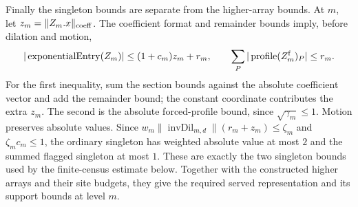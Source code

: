 Finally the singleton bounds are separate from the higher-array
bounds. At $m$, let $z_m=\|Z_m.x\|_{\rm coeff}$. The coefficient
format and remainder bounds imply, before dilation and motion,
\[
 |\operatorname{exponentialEntry}(Z_m)|\le(1+c_m)z_m+r_m,
 \qquad \sum_P|\operatorname{profile}(Z_m^{\rm f})_P|\le r_m.
\]
For the first inequality, sum the section bounds against the
absolute coefficient vector and add the remainder bound; the
constant coordinate contributes the extra $z_m$. The second
is the absolute forced-profile bound, since
$\sqrt{\gamma_m}\le1$. Motion preserves absolute values.
Since $w_m\|\operatorname{invDil}_{m,d}\|(r_m+z_m)\le\zeta_m$
and $\zeta_mc_m\le1$, the ordinary singleton has weighted
absolute value at most $2$ and the summed flagged singleton at
most $1$. These are exactly the two singleton bounds used by the finite-census
estimate below. Together with the constructed higher arrays and
their site budgets, they give the required served representation and
its support bounds at level $m$.

